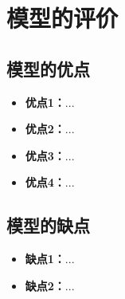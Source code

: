\section{模型的评价}

\subsection{模型的优点}
\begin{itemize}[itemindent=2em]
\item \textbf{优点1：}...
\item \textbf{优点2：}...
\item \textbf{优点3：}...
\item \textbf{优点4：}...
\end{itemize}

\subsection{模型的缺点}
\begin{itemize}[itemindent=2em]
\item \textbf{缺点1：}...
\item \textbf{缺点2：}...
\end{itemize}
